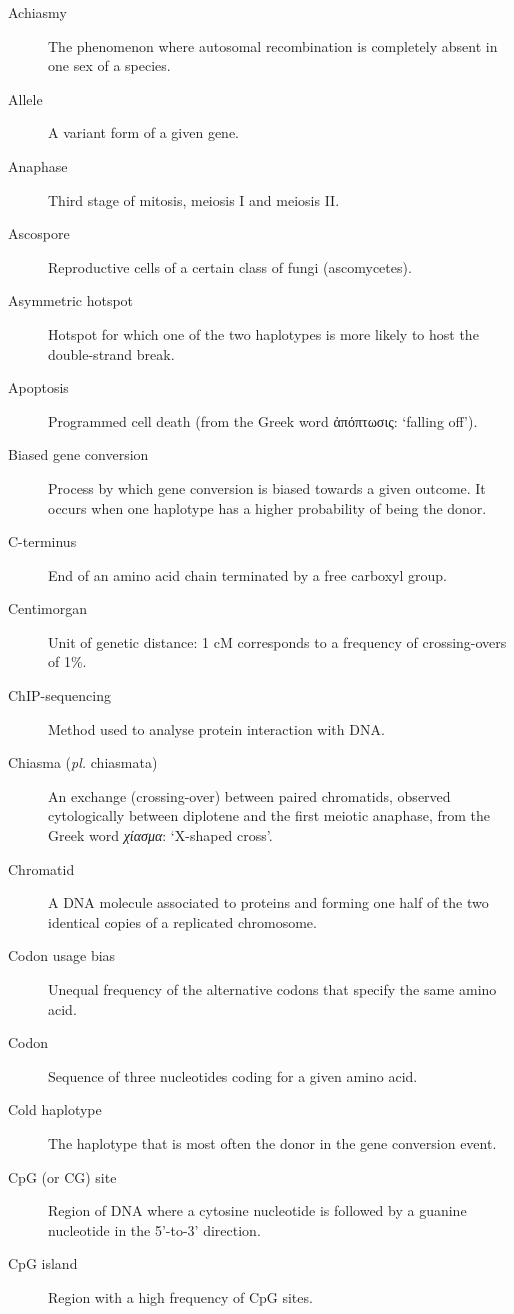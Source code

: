 \begin{alwayssingle}
\begin{description}
		\item[Achiasmy] The phenomenon where autosomal recombination is completely absent in one sex of a species.
		\item[Allele] A variant form of a given gene.
		\item[Anaphase] Third stage of mitosis, meiosis I and meiosis II\@.
		\item[Ascospore] Reproductive cells of a certain class of fungi (ascomycetes).
		\item[Asymmetric hotspot] Hotspot for which one of the two haplotypes is more likely to host the double-strand break.
		\item[Apoptosis] Programmed cell death (from the Greek word \textgreek{ἀπόπτωσις}: ‘falling off’).
		\item[Biased gene conversion] Process by which gene conversion is biased towards a given outcome. It occurs when one haplotype has a higher probability of being the donor.
		\item[C-terminus] End of an amino acid chain terminated by a free carboxyl group.
		\item[Centimorgan] Unit of genetic distance: 1 cM corresponds to a frequency of crossing-overs of 1\%.
		\item[ChIP-sequencing] Method used to analyse protein interaction with DNA\@.
		\item[Chiasma (\textit{pl.} chiasmata)] An exchange (crossing-over) between paired chromatids, observed cytologically between diplotene and the first meiotic anaphase, from the Greek word \textit{\textgreek{χίασμα}}: ‘X-shaped cross’.%
		\item[Chromatid] A DNA molecule associated to proteins and forming one half of the two identical copies of a replicated chromosome.
		\item[Codon usage bias] Unequal frequency of the alternative codons that specify the same amino acid.
		\item[Codon] Sequence of three nucleotides coding for a given amino acid.
		\item[Cold haplotype] The haplotype that is most often the donor in the gene conversion event.
		\item[CpG (or CG) site] Region of DNA where a cytosine nucleotide is followed by a guanine nucleotide in the 5’-to-3’ direction.
		\item[CpG island] Region with a high frequency of CpG sites.

\end{description}
\end{alwayssingle}
